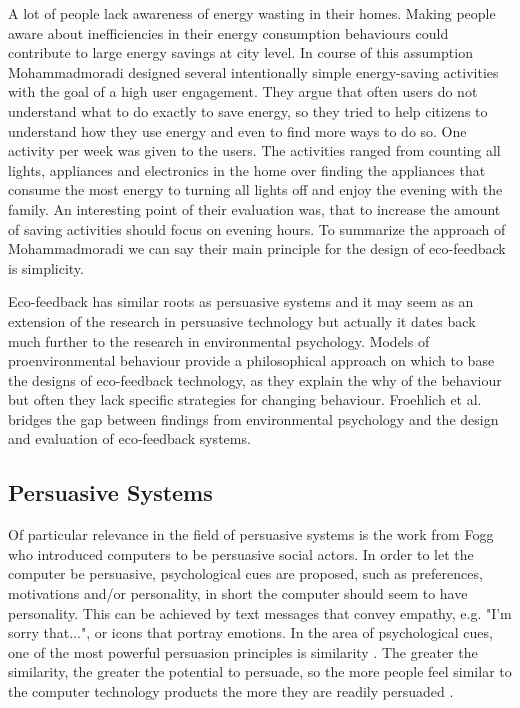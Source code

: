 A lot of people lack awareness of energy wasting in their homes. Making people aware about inefficiencies in their energy consumption behaviours could contribute to large energy savings at city level. In course of this assumption Mohammadmoradi \cite{mohammadmoradi2017effectiveness} designed several intentionally simple energy-saving activities with the goal of a high user engagement. They argue that often users do not understand what to do exactly to save energy, so they tried to help citizens to understand how they use energy and even to find more ways to do so. One activity per week was given to the users. The activities ranged from counting all lights, appliances and electronics in the home over finding the appliances that consume the most energy to turning all lights off and enjoy the evening with the family. An interesting point of their evaluation was, that to increase the amount of saving activities should focus on evening hours. To summarize the approach of Mohammadmoradi we can say their main principle for the design of eco-feedback is simplicity.

Eco-feedback has similar roots as persuasive systems and it may seem as an extension of the research in persuasive technology but actually it dates back much further to the research in environmental psychology. Models of proenvironmental behaviour provide a philosophical approach on which to base the designs of eco-feedback technology, as they explain the why of the behaviour but often they lack specific strategies for changing behaviour. Froehlich et al. \cite{froehlich2010design} bridges the gap between findings from environmental psychology and the design and evaluation of eco-feedback systems.


\subsection{Persuasive Systems}
\label{chap:persuasivesystem}

Of particular relevance in the field of persuasive systems is the work from Fogg \cite{fogg2002persuasive} who introduced computers to be persuasive social actors. In order to let the computer be persuasive, psychological cues are proposed, such as preferences, motivations and/or personality, in short the computer should seem to have personality. This can be achieved by text messages that convey empathy, e.g. "I'm sorry that...", or icons that portray emotions. In the area of psychological cues, one of the most powerful persuasion principles is similarity \cite{tajfel2010social}. The greater the similarity, the greater the potential to persuade, so the more people feel similar to the computer technology products the more they are readily persuaded \cite{fogg2002persuasive}.

